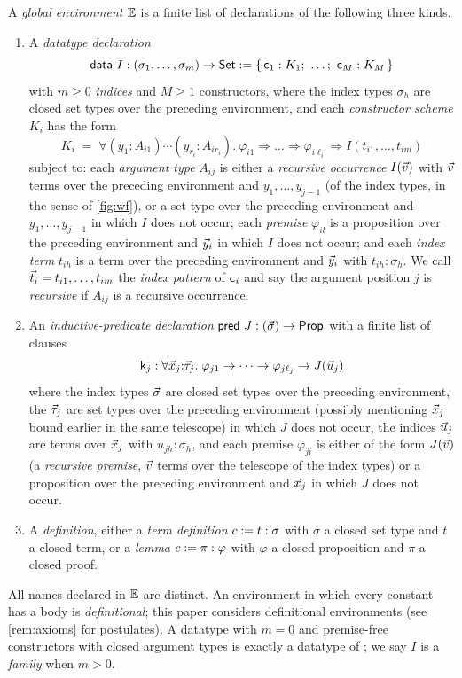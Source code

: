 \begin{definition}
\label{def:env}
A \emph{global environment} $\mathbb{E}$ is a finite list of declarations of
the following three kinds.
\begin{enumerate}[leftmargin=2em]
\item A \emph{datatype declaration}
  \[
    \mathsf{data}\ I : (\sigma_1, \dots, \sigma_m) \to \mathsf{Set} \mathrel{:=}
    \{\, \mathsf{c}_1 : K_1;\ \dots;\ \mathsf{c}_M : K_M \,\}
  \]
  with $m \geq 0$ \emph{indices} and $M \geq 1$ constructors, where the
  index types $\sigma_h$ are closed set types over the preceding
  environment, and each \emph{constructor scheme} $K_i$ has the form
  \[
    K_i \;=\; \forall (y_{1}{:}A_{i1}) \cdots (y_{r_i}{:}A_{ir_i}).\
      \varphi_{i1} \Rightarrow \dots \Rightarrow \varphi_{i\ell_i}
      \Rightarrow I(t_{i1}, \dots, t_{im})
  \]
  subject to: each \emph{argument type} $A_{ij}$ is either a
  \emph{recursive occurrence} $I(\vec{v})$ with $\vec{v}$ terms over the
  preceding environment and $y_1, \dots, y_{j-1}$ (of the index types,
  in the sense of \cref{fig:wf}), or a set type over the preceding
  environment and $y_1, \dots, y_{j-1}$ in which $I$ does not occur;
  each \emph{premise} $\varphi_{il}$ is a proposition over the preceding
  environment and $\vec{y}_i$ in which $I$ does not occur; and each
  \emph{index term} $t_{ih}$ is a term over the preceding environment
  and $\vec{y}_i$ with $t_{ih} : \sigma_h$.  We call $\vec{t}_i =
  t_{i1}, \dots, t_{im}$ the \emph{index pattern} of $\mathsf{c}_i$ and
  say the argument position $j$ is \emph{recursive} if $A_{ij}$ is a
  recursive occurrence.
\item An \emph{inductive-predicate declaration}
  $\mathsf{pred}\ J : (\vec{\sigma}) \to \mathsf{Prop}$ with a finite list of
  clauses
  \[
    \mathsf{k}_j : \forall \vec{x}_j{:}\vec{\tau}_j.\;
      \varphi_{j1} \to \dots \to \varphi_{j\ell_j} \to J(\vec{u}_j)
  \]
  where the index types $\vec{\sigma}$ are closed set types over the
  preceding environment, the $\vec{\tau}_j$ are set types over the
  preceding environment (possibly mentioning $\vec{x}_j$ bound earlier
  in the same telescope) in which $J$ does not occur, the indices
  $\vec{u}_j$ are terms over $\vec{x}_j$ with $u_{jh} : \sigma_h$, and
  each premise $\varphi_{ji}$ is either of the form $J(\vec{v})$ (a
  \emph{recursive premise}, $\vec{v}$ terms over the telescope of the
  index types) or a proposition over the preceding environment and
  $\vec{x}_j$ in which $J$ does not occur.
\item A \emph{definition}, either a \emph{term definition} $c \mathrel{:=} t :
  \sigma$ with $\sigma$ a closed set type and $t$ a closed term, or a
  \emph{lemma} $c \mathrel{:=} \pi : \varphi$ with $\varphi$ a closed
  proposition and $\pi$ a closed proof.
\end{enumerate}
All names declared in $\mathbb{E}$ are distinct.  An environment in which
every constant has a body is \emph{definitional}; this paper considers
definitional environments (see \cref{rem:axioms} for postulates).
A datatype with $m = 0$ and premise-free constructors with closed
argument types is exactly a datatype of \cite{Extraction2026}; we say
$I$ is a \emph{family} when $m > 0$.
\end{definition}

